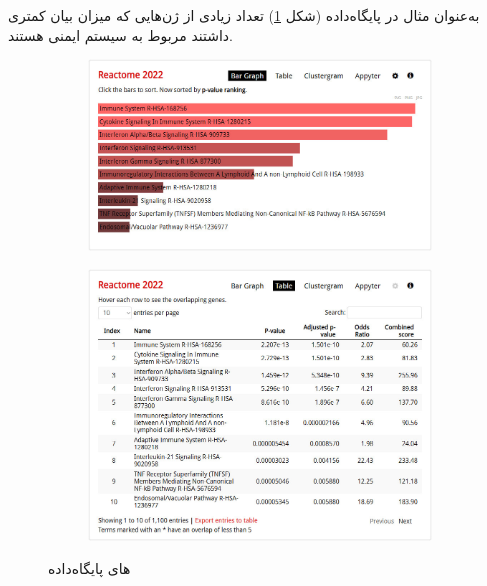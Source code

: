 \documentclass{article}
\begin{document}
به‌عنوان مثال در پایگاه‌داده  (شکل \ref{fig:enrichr-pathways-reactome}) تعداد زیادی از ژن‌هایی که میزان بیان کمتری داشتند مربوط به  سیستم ایمنی  هستند.
\begin{figure}[h!]
	\begin{subfigure}{.59\columnwidth}
		\centering
		\includegraphics[width=\columnwidth]{figs/enrichr-pathways-reactome.jpg}
	\end{subfigure}
	\begin{subfigure}{.41\columnwidth}
		\centering
		\includegraphics[width=\columnwidth]{figs/enrichr-pathways-reactome-tab.jpg}
	\end{subfigure}
	\caption{های پایگاه‌داده }
	\label{fig:enrichr-pathways-reactome}
\end{figure}
\end{document}
